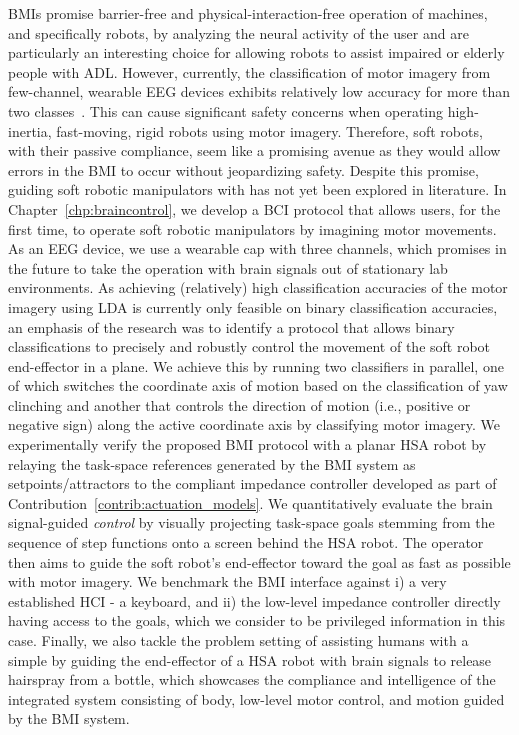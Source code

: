 \glspl{BMI} promise barrier-free and physical-interaction-free operation of machines, and specifically robots, by analyzing the neural activity of the user and are particularly an interesting choice for allowing robots to assist impaired or elderly people with \gls{ADL}.
However, currently, the classification of motor imagery from few-channel, wearable EEG devices exhibits relatively low accuracy for more than two classes~\cite{arpaia2022non, lee2024noir}. This can cause significant safety concerns when operating high-inertia, fast-moving, rigid robots using motor imagery. Therefore, soft robots, with their passive compliance, seem like a promising avenue as they would allow errors in the \gls{BMI} to occur without jeopardizing safety.
Despite this promise, guiding soft robotic manipulators with  has not yet been explored in literature.
In Chapter~\ref{chp:braincontrol}, we develop a \gls{BCI} protocol that allows users, for the first time, to operate soft robotic manipulators by imagining motor movements.
As an \gls{EEG} device, we use a wearable cap with three channels, which promises in the future to take the operation with brain signals out of stationary lab environments.
As achieving (relatively) high classification accuracies of the motor imagery using \gls{LDA} is currently only feasible on binary classification accuracies, an emphasis of the research was to identify a protocol that allows binary classifications to precisely and robustly control the movement of the soft robot end-effector in a plane.
We achieve this by running two classifiers in parallel, one of which switches the coordinate axis of motion based on the classification of yaw clinching and another that controls the direction of motion (i.e., positive or negative sign) along the active coordinate axis by classifying motor imagery. 
We experimentally verify the proposed \gls{BMI} protocol with a planar \gls{HSA} robot by relaying the task-space references generated by the \gls{BMI} system as setpoints/attractors to the compliant impedance controller developed as part of Contribution~\ref{contrib:actuation_models}.
We quantitatively evaluate the brain signal-guided \emph{control} by visually projecting task-space goals stemming from the sequence of step functions onto a screen behind the \gls{HSA} robot.
The operator then aims to guide the soft robot's end-effector toward the goal as fast as possible with motor imagery.
We benchmark the \gls{BMI} interface against i) a very established \gls{HCI} - a keyboard, and ii) the low-level impedance controller directly having access to the goals, which we consider to be privileged information in this case.
Finally, we also tackle the problem setting of assisting humans with a simple  by guiding the end-effector of a \gls{HSA} robot with brain signals to release hairspray from a bottle, which showcases the compliance and intelligence of the integrated system consisting of body, low-level motor control, and motion guided by the \gls{BMI} system.


